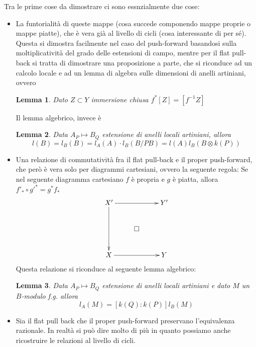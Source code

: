 \documentclass{amsbook}
\newcommand{\inv}{^{-1}}
\newcommand{\mm}{\mapsto}
\newtheorem{lem}{Lemma}
\theoremstyle{remark}
\begin{document}
Tra le prime cose da dimostrare ci sono essnzialmente due cose:
\begin{itemize}
\item La funtorialità di queste mappe (cosa succede componendo mappe proprie o mappe piatte), che è vera già al livello di cicli (cosa interessante di per sé). Questa si dimostra facilmente nel caso del push-forward basandosi sulla moltiplicatività del grado delle estensioni di campo, mentre per il flat pull-back si tratta di dimostrare una proposizione a parte, che si riconduce ad un calcolo locale e ad un lemma di algebra sulle dimensioni  di anelli artiniani, ovvero 
\begin{lem}
Dato $Z\subset Y$ immersione chiusa $f^*[Z]=[f\inv Z]$
\end{lem}
\noindent Il lemma algebrico, invece è
\begin{lem}
Data $A_P\mm B_Q$ estensione di anelli locali artiniani, allora
\[ l(B)=l_B(B)=l_A(A)\cdot l_B(B/PB)=l(A)l_B(B\otimes k(P))	\]
\end{lem}

\item Una relazione di commutatività fra il flat pull-back e il proper push-forward, che però è vera solo per diagrammi cartesiani, ovvero la seguente regola: Se nel seguente diagramma cartesiano $f$ è propria e $g$ è piatta, allora $f'_*\circ g'^*= g^*f_*$
$$\xymatrix{
X' \ar[rr] \ar[dd] &       & Y'\\
& \square \\
X\ar[rr] & &Y\\
}$$
Questa relazione si riconduce al seguente lemma algebrico:
\begin{lem}
Data $A_P\mm B_Q$ estensione di anelli locali artiniani e dato $M$ un $B$-modulo f.g. allora 
\[ l_A(M)=[k(Q):k(P)]l_B(M) \] 
\end{lem}

\item Sia il flat pull back che il proper push-forward preservano l'equivalenza razionale. In realtà si può dire molto di più in quanto possiamo anche ricostruire le relazioni al livello di cicli. 
\end{itemize}
\end{document}
